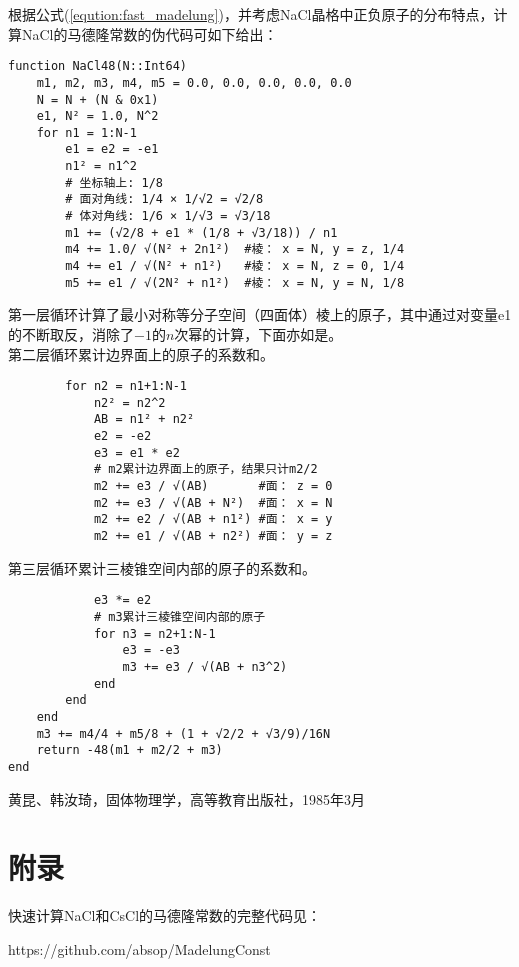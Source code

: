 \documentclass{style}
\begin{document}
\newpage
\indent 根据公式(\ref{eqution:fast_madelung})，并考虑NaCl晶格中正负原子的分布特点，计算NaCl的马德隆常数的伪代码可如下给出：
\begin{center}
\begin{lstlisting}
function NaCl48(N::Int64)
    m1, m2, m3, m4, m5 = 0.0, 0.0, 0.0, 0.0, 0.0
    N = N + (N & 0x1)
    e1, N² = 1.0, N^2
    for n1 = 1:N-1
        e1 = e2 = -e1
        n1² = n1^2
        # 坐标轴上: 1/8
        # 面对角线: 1/4 × 1/√2 = √2/8
        # 体对角线: 1/6 × 1/√3 = √3/18
        m1 += (√2/8 + e1 * (1/8 + √3/18)) / n1
        m4 += 1.0/ √(N² + 2n1²)  #棱： x = N, y = z, 1/4
        m4 += e1 / √(N² + n1²)   #棱： x = N, z = 0, 1/4
        m5 += e1 / √(2N² + n1²)  #棱： x = N, y = N, 1/8
\end{lstlisting}
\end{center}
第一层循环计算了最小对称等分子空间（四面体）棱上的原子，其中通过对变量e1的不断取反，消除了$-1$的$n$次幂的计算，下面亦如是。\\

第二层循环累计边界面上的原子的系数和。
\begin{center}
\begin{lstlisting}
        for n2 = n1+1:N-1
            n2² = n2^2
            AB = n1² + n2²
            e2 = -e2
            e3 = e1 * e2
            # m2累计边界面上的原子，结果只计m2/2
            m2 += e3 / √(AB)       #面： z = 0
            m2 += e3 / √(AB + N²)  #面： x = N
            m2 += e2 / √(AB + n1²) #面： x = y
            m2 += e1 / √(AB + n2²) #面： y = z
\end{lstlisting}
\end{center}

\newpage
第三层循环累计三棱锥空间内部的原子的系数和。
\begin{center}
\begin{lstlisting}
            e3 *= e2
            # m3累计三棱锥空间内部的原子
            for n3 = n2+1:N-1
                e3 = -e3
                m3 += e3 / √(AB + n3^2)
            end
        end
    end
    m3 += m4/4 + m5/8 + (1 + √2/2 + √3/9)/16N
    return -48(m1 + m2/2 + m3)
end
\end{lstlisting}
\end{center}

\begin{thebibliography}{9}%
 黄昆、韩汝琦，固体物理学，高等教育出版社，1985年3月
\end{thebibliography}

\appendix
\section*{附录}
快速计算NaCl和CsCl的马德隆常数的完整代码见：
\begin{center}
https://github.com/absop/MadelungConst
\end{center}
\end{document}
